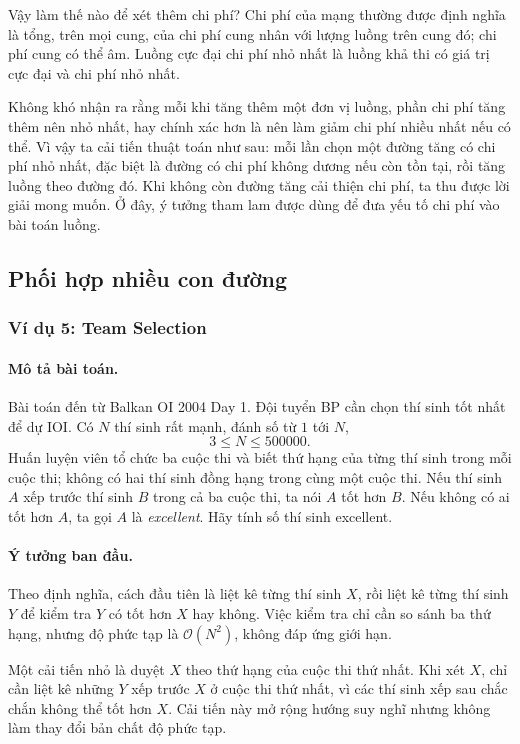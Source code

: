 \documentclass[11pt]{article}
\newcommand{\Oh}{\mathcal{O}}
\begin{document}
Vậy làm thế nào để xét thêm chi phí? Chi phí của mạng thường được định nghĩa
là tổng, trên mọi cung, của chi phí cung nhân với lượng luồng trên cung đó;
chi phí cung có thể âm. Luồng cực đại chi phí nhỏ nhất là luồng khả thi có
giá trị cực đại và chi phí nhỏ nhất.

Không khó nhận ra rằng mỗi khi tăng thêm một đơn vị luồng, phần chi phí tăng
thêm nên nhỏ nhất, hay chính xác hơn là nên làm giảm chi phí nhiều nhất nếu có
thể. Vì vậy ta cải tiến thuật toán như sau: mỗi lần chọn một đường tăng có chi
phí nhỏ nhất, đặc biệt là đường có chi phí không dương nếu còn tồn tại, rồi
tăng luồng theo đường đó. Khi không còn đường tăng cải thiện chi phí, ta thu
được lời giải mong muốn. Ở đây, ý tưởng tham lam được dùng để đưa yếu tố chi
phí vào bài toán luồng.

\subsection{Phối hợp nhiều con đường}

\subsubsection{Ví dụ 5: Team Selection}

\paragraph{Mô tả bài toán.}
Bài toán đến từ Balkan OI 2004 Day 1. Đội tuyển BP cần chọn thí sinh tốt nhất
để dự IOI. Có $N$ thí sinh rất mạnh, đánh số từ $1$ tới $N$,
\[
  3\le N\le 500000.
\]
Huấn luyện viên tổ chức ba cuộc thi và biết thứ hạng của từng thí sinh trong
mỗi cuộc thi; không có hai thí sinh đồng hạng trong cùng một cuộc thi. Nếu
thí sinh $A$ xếp trước thí sinh $B$ trong cả ba cuộc thi, ta nói $A$ tốt hơn
$B$. Nếu không có ai tốt hơn $A$, ta gọi $A$ là \textit{excellent}. Hãy tính
số thí sinh excellent.

\paragraph{Ý tưởng ban đầu.}
Theo định nghĩa, cách đầu tiên là liệt kê từng thí sinh $X$, rồi liệt kê từng
thí sinh $Y$ để kiểm tra $Y$ có tốt hơn $X$ hay không. Việc kiểm tra chỉ cần
so sánh ba thứ hạng, nhưng độ phức tạp là $\Oh(N^2)$, không đáp ứng giới hạn.

Một cải tiến nhỏ là duyệt $X$ theo thứ hạng của cuộc thi thứ nhất. Khi xét
$X$, chỉ cần liệt kê những $Y$ xếp trước $X$ ở cuộc thi thứ nhất, vì các thí
sinh xếp sau chắc chắn không thể tốt hơn $X$. Cải tiến này mở rộng hướng suy
nghĩ nhưng không làm thay đổi bản chất độ phức tạp.
\end{document}
